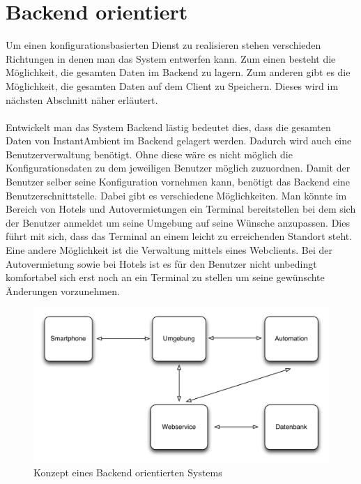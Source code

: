 \section{Backend orientiert}
Um einen konfigurationsbasierten Dienst zu realisieren stehen verschieden Richtungen in denen man das System entwerfen kann. 
Zum einen besteht die Möglichkeit, die gesamten Daten im Backend zu lagern. Zum anderen gibt es die Möglichkeit, die gesamten Daten auf dem Client zu Speichern. Dieses wird im nächsten Abschnitt näher erläutert.
\\\\
Entwickelt man das System Backend lästig bedeutet dies, dass die gesamten Daten von InstantAmbient im Backend gelagert werden. 
Dadurch wird auch eine Benutzerverwaltung benötigt. Ohne diese wäre es nicht möglich die Konfigurationsdaten zu dem jeweiligen Benutzer möglich zuzuordnen. Damit der Benutzer selber seine Konfiguration vornehmen kann, benötigt das Backend eine Benutzerschnittstelle. Dabei gibt es verschiedene Möglichkeiten. Man könnte im Bereich von Hotels und Autovermietungen ein Terminal bereitstellen bei dem sich der Benutzer anmeldet um seine Umgebung auf seine Wünsche anzupassen. Dies führt mit sich, dass das Terminal an einem leicht zu erreichenden Standort steht. Eine andere Möglichkeit ist die Verwaltung mittels eines Webclients. Bei der Autovermietung sowie bei Hotels ist es für den Benutzer nicht unbedingt komfortabel sich erst noch an ein Terminal zu stellen um seine gewünschte Änderungen vorzunehmen. 
\begin{figure}[H]
\includegraphics[width=12.5cm]{images/backend}
\caption{Konzept eines Backend orientierten Systems}
\end{figure}

